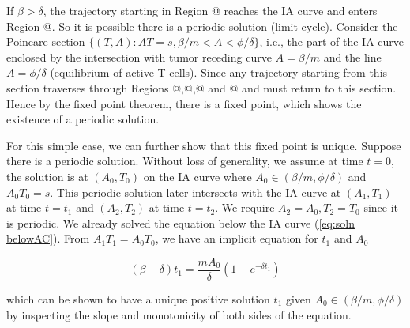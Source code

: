 \documentclass[review,authoryear]{elsarticle}
\makeatletter
\newcommand*{\rom}[1]{\expandafter\@slowromancap\romannumeral #1@}
\makeatother
\begin{document}
If $\beta>\delta$, the trajectory starting in Region \rom{2} reaches the IA curve 
and enters Region \rom{3}. So it is possible there is a periodic solution (limit cycle). Consider
the Poincare section $\{(T,A):AT=s,\beta/m<A<\phi/\delta \}$, i.e., the part of the IA curve enclosed by 
the intersection with tumor receding curve $A=\beta/m$ 
and the line $A=\phi / \delta$ (equilibrium of active T cells).
Since any trajectory starting from this section traverses through Regions \rom{1},\rom{2},\rom{3} and \rom{4} and must
return to this section. Hence by the fixed point theorem, there is
a fixed point, which shows the existence of a periodic solution.

For this simple case, we can further show that this fixed point is
unique. Suppose there is a periodic solution. Without loss of generality,
we assume at time $t=0$, the solution is at $(A_{0},T_{0})$ on the
IA curve where $A_{0}\in(\beta/m,\phi/\delta)$ and $A_{0}T_{0}=s$.
This periodic solution later intersects with the IA curve at $(A_{1},T_{1})$
at time $t=t_{1}$ and $(A_{2},T_{2})$ at time $t=t_{2}$. We require
$A_{2}=A_{0},T_{2}=T_{0}$ since it is periodic. We already solved
the equation below the IA curve (\ref{eq:soln belowAC}). From $A_{1}T_{1}=A_{0}T_{0}$, we
have an implicit equation for $t_{1}$ and $A_{0}$
\begin{linenomath*}
\begin{equation}
(\beta-\delta)t_{1}=\frac{mA_{0}}{\delta}(1-e^{-\delta t_{1}})\label{eq:A1T1=00003DA0T0}
\end{equation}
\end{linenomath*}
which can be shown to have a unique positive solution $t_{1}$ given $A_{0}\in(\beta/m,\phi/\delta)$ by inspecting the slope and monotonicity of both sides of the equation. 
\end{document}
